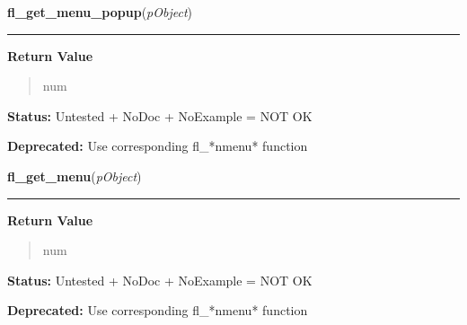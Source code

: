     \label{xformslib:library:fl_get_menu_popup}

    \vspace{0.5ex}

\hspace{.8\funcindent}\begin{boxedminipage}{\funcwidth}

    \raggedright \textbf{fl\_get\_menu\_popup}(\textit{pObject})

    \vspace{-1.5ex}

    \rule{\textwidth}{0.5\fboxrule}
\setlength{\parskip}{2ex}
\setlength{\parskip}{1ex}
      \textbf{Return Value}
    \vspace{-1ex}

      \begin{quote}
      num

      \end{quote}

\textbf{Status:} Untested + NoDoc + NoExample = NOT OK



\textbf{Deprecated:} Use corresponding fl\_*nmenu* function



    \end{boxedminipage}

    \label{xformslib:library:fl_get_menu}

    \vspace{0.5ex}

\hspace{.8\funcindent}\begin{boxedminipage}{\funcwidth}

    \raggedright \textbf{fl\_get\_menu}(\textit{pObject})

    \vspace{-1.5ex}

    \rule{\textwidth}{0.5\fboxrule}
\setlength{\parskip}{2ex}
\setlength{\parskip}{1ex}
      \textbf{Return Value}
    \vspace{-1ex}

      \begin{quote}
      num

      \end{quote}

\textbf{Status:} Untested + NoDoc + NoExample = NOT OK



\textbf{Deprecated:} Use corresponding fl\_*nmenu* function



    \end{boxedminipage}

